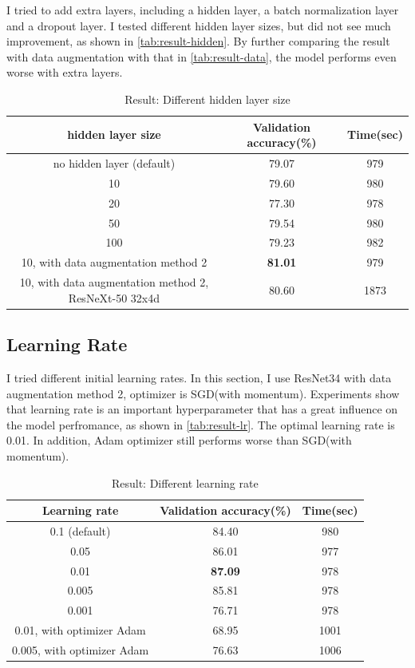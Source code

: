\documentclass[10pt]{article}
\begin{document}
I tried to add extra layers, including a hidden layer, a batch normalization layer and a dropout layer. I tested different hidden layer sizes, but did not see much improvement, as shown in \autoref{tab:result-hidden}. 
By further comparing the result with data augmentation with that in \autoref{tab:result-data}, the model performs even worse with extra layers.

\begin{table}[htb]
\centering
\caption{Result: Different hidden layer size}
\begin{tabular}{c|c|c}
\hline
\textbf{hidden layer size}   & \textbf{Validation accuracy(\%)}   & \textbf{Time(sec)}   \\ \hline
no hidden layer (default)     & 79.07   & 979      \\
10   &  79.60     & 980   \\
20      & 77.30    & 978        \\
50     & 79.54    & 980       \\
100        & 79.23  & 982     \\
10, with data augmentation method 2        & \textbf{81.01}  & 979     \\
10, with data augmentation method 2, ResNeXt-50 32x4d & 80.60 & 1873 \\
\hline
\end{tabular}
\label{tab:result-hidden}
\end{table}

\subsection{Learning Rate}

I tried different initial learning rates. In this section, I use ResNet34 with data augmentation method 2, optimizer is SGD(with momentum). Experiments show that learning rate is an important hyperparameter that has a great influence on the model perfromance, as shown in \autoref{tab:result-lr}. The optimal learning rate is 0.01. In addition, Adam optimizer still performs worse than SGD(with momentum).

\begin{table}[htb]
\centering
\caption{Result: Different learning rate}
\begin{tabular}{c|c|c}
\hline
\textbf{Learning rate}   & \textbf{Validation accuracy(\%)}   & \textbf{Time(sec)}   \\ \hline
0.1 (default)     & 84.40   & 980      \\
0.05   &  86.01     & 977   \\
0.01      & \textbf{87.09}    & 978        \\
0.005     & 85.81    & 978       \\
0.001        & 76.71  & 978     \\
0.01, with optimizer Adam       & 68.95  & 1001     \\
0.005, with optimizer Adam       & 76.63  & 1006     \\
\hline
\end{tabular}
\label{tab:result-lr}
\end{table}
\end{document}
